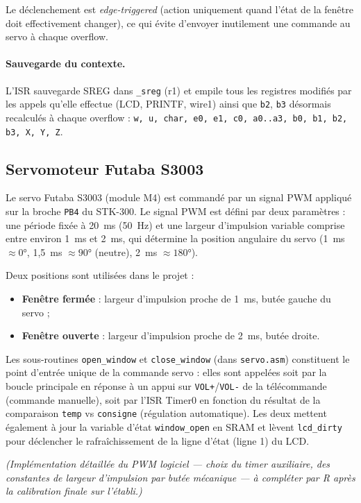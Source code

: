 \documentclass[11pt]{article}
\begin{document}
Le déclenchement est \textit{edge-triggered} (action uniquement quand l'état de la fenêtre doit effectivement changer), ce qui évite d'envoyer inutilement une commande au servo à chaque overflow.

\paragraph{Sauvegarde du contexte.} L'ISR sauvegarde SREG dans \texttt{\_sreg} (r1) et empile tous les registres modifiés par les appels qu'elle effectue (LCD, PRINTF, wire1) ainsi que \texttt{b2}, \texttt{b3} désormais recalculés à chaque overflow : \texttt{w, u, char, e0, e1, c0, a0..a3, b0, b1, b2, b3, X, Y, Z}.

\subsection{Servomoteur Futaba S3003}

Le servo Futaba S3003 (module M4) est commandé par un signal PWM appliqué sur la broche \texttt{PB4} du STK-300. Le signal PWM est défini par deux paramètres : une période fixée à 20~ms (50~Hz) et une largeur d'impulsion variable comprise entre environ 1~ms et 2~ms, qui détermine la position angulaire du servo (1~ms $\approx 0°$, 1,5~ms $\approx 90°$ (neutre), 2~ms $\approx 180°$).

Deux positions sont utilisées dans le projet :

\begin{itemize}
  \item \textbf{Fenêtre fermée} : largeur d'impulsion proche de 1~ms, butée gauche du servo ;
  \item \textbf{Fenêtre ouverte} : largeur d'impulsion proche de 2~ms, butée droite.
\end{itemize}

Les sous-routines \texttt{open\_window} et \texttt{close\_window} (dans \texttt{servo.asm}) constituent le point d'entrée unique de la commande servo : elles sont appelées soit par la boucle principale en réponse à un appui sur \texttt{VOL+}/\texttt{VOL-} de la télécommande (commande manuelle), soit par l'ISR Timer0 en fonction du résultat de la comparaison \texttt{temp} vs \texttt{consigne} (régulation automatique). Les deux mettent également à jour la variable d'état \texttt{window\_open} en SRAM et lèvent \texttt{lcd\_dirty} pour déclencher le rafraîchissement de la ligne d'état (ligne 1) du LCD.

\textit{(Implémentation détaillée du PWM logiciel --- choix du timer auxiliaire, des constantes de largeur d'impulsion par butée mécanique --- à compléter par R après la calibration finale sur l'établi.)}
\end{document}

